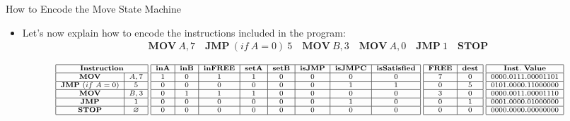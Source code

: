 \begin{frame}[allowframebreaks]{How to Encode the Move State Machine}
\begin{itemize}
\item Let's now explain how to encode the instructions included in the program:
\begin{align*}
\mathbf{MOV}~A, 7 \quad \mathbf{JMP}~(if~A = 0)~5 \quad \mathbf{MOV}~B,3 \quad \mathbf{MOV}~A,0 \quad \mathbf{JMP}~1 \quad \mathbf{STOP}
\end{align*}
\end{itemize}
\[
\scriptsize
\begin{array}{|c|c|}
\hline
\multicolumn{2}{|c|}{\mathbf{Instruction}} \\ \hline
\mathbf{MOV} & A, 7 \\ \hline
\mathbf{JMP}~(if~A = 0) & 5 \\ \hline
\mathbf{MOV} & B,3 \\ \hline
\mathbf{JMP} & 1 \\ \hline
\mathbf{STOP} & \emptyset \\ \hline
\end{array}
\hspace{0.1cm}
\begin{array}{|c|c|c|c|c|c|c|c|}
\hline
\textbf{inA} & \textbf{inB} & \textbf{inFREE} & \textbf{setA} & \textbf{setB} & \textbf{isJMP} & \textbf{isJMPC} & \textbf{isSatisfied} \\ \hline
1 & 0 & 1 & 1 & 0 & 0 & 0 & 0 \\ \hline
0 & 0 & 0 & 0 & 0 & 0 & 1 & 1 \\ \hline
0 & 1 & 1 & 1 & 0 & 0 & 0 & 0 \\ \hline
0 & 0 & 0 & 0 & 0 & 0 & 1 & 0 \\ \hline
0 & 0 & 0 & 0 & 0 & 0 & 0 & 0 \\ \hline
\end{array}
\hspace{0.1cm}
\begin{array}{|c|c|}
\hline
\mathbf{FREE} & \mathbf{dest} \\ \hline
7 & 0 \\ \hline
0 & 5 \\ \hline
3 & 0 \\ \hline
0 & 1 \\ \hline
0 & 0 \\ \hline
\end{array}
\hspace{0.1cm}
\begin{array}{|c|}
\hline
\mathbf{Inst.~Value} \\ \hline
0000.0111.00001101 \\ \hline
0101.0000.11000000 \\ \hline
0000.0011.00001110 \\ \hline
0001.0000.01000000 \\ \hline
0000.0000.00000000 \\ \hline
\end{array}
\]


\end{frame}
